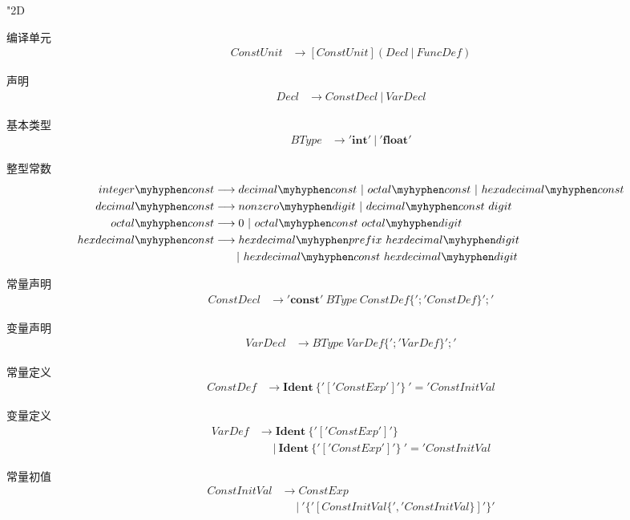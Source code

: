 \usepackage{align}
\mathchardef\myhyphen"2D

编译单元
\begin{align*}
    ConstUnit &\longrightarrow [ConstUnit](Decl\ |\ FuncDef)
\end{align*}

声明
\begin{align*}
    Decl &\longrightarrow ConstDecl\ |\ VarDecl
\end{align*}

基本类型
\begin{align*}
    BType &\longrightarrow \mathbf{'int'}\ |\ \mathbf{'float'}
\end{align*}

整型常数
\begin{align*}
    integer\myhyphen const &\longrightarrow decimal\myhyphen const\ |\ octal\myhyphen const\ |\ hexadecimal\myhyphen const \\
    decimal\myhyphen const &\longrightarrow nonzero\myhyphen digit\ |\ decimal\myhyphen const\ digit \\
    octal\myhyphen const &\longrightarrow 0\ |\ octal\myhyphen const\ octal\myhyphen digit \\
    hexdecimal\myhyphen const &\longrightarrow hexdecimal\myhyphen prefix\ hexdecimal\myhyphen digit\\ 
    &\ \ \ \ \ \ |\ hexdecimal\myhyphen const\ hexdecimal\myhyphen digit 
\end{align*}

常量声明
\begin{align*}
    ConstDecl &\longrightarrow \mathbf{'const'}\ BType\ ConstDef\{';'ConstDef\}';'
\end{align*}

变量声明
\begin{align*}
    VarDecl &\longrightarrow BType\ VarDef\{';'VarDef\}';'
\end{align*}

常量定义
\begin{align*}
    ConstDef &\longrightarrow \mathbf{Ident}\ \{'['ConstExp']'\}\ '=' ConstInitVal
\end{align*}

变量定义
\begin{align*}
    VarDef &\longrightarrow \mathbf{Ident}\ \{'['ConstExp']'\}\\
    &\ \ \ \ \ \ |\ \mathbf{Ident}\ \{'['ConstExp']'\}\ '=' ConstInitVal
\end{align*}

常量初值
\begin{align*}
    ConstInitVal &\longrightarrow ConstExp\\
    &\ \ \ \ \ \ |\ '\{'[ConstInitVal\{','ConstInitVal\}]'\}'
\end{align*}

